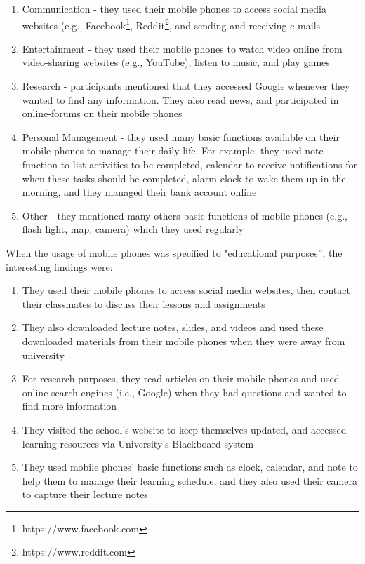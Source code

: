 \begin{enumerate}
\item Communication - they used their mobile phones to access social media websites (e.g., Facebook\footnote{https://www.facebook.com}, Reddit\footnote{https://www.reddit.com}, and sending and receiving e-mails

\item Entertainment - they used their mobile phones to watch video online from video-sharing websites (e.g., YouTube), listen to music, and play games

\item Research - participants mentioned that they accessed Google whenever they wanted to find any information. They also read news, and participated in online-forums on their mobile phones

\item Personal Management - they used many basic functions available on their mobile phones to manage their daily life. For example, they used note function to list activities to be completed, calendar to receive notifications for when these tasks should be completed, alarm clock to wake them up in the morning, and they managed their bank account online

\item Other - they mentioned many others basic functions of mobile phones (e.g., flash light, map, camera) which they used regularly
\end{enumerate}

When the usage of mobile phones was specified to "educational purposes'', the interesting findings were:

\begin{enumerate}
\item They used their mobile phones to access social media websites, then contact their classmates to discuss their lessons and assignments
\item They also downloaded lecture notes, slides, and videos and used these downloaded materials from their mobile phones when they were away from university
\item For research purposes, they read articles on their mobile phones and used online search engines (i.e., Google) when they had questions and wanted to find more information
\item They visited the school's website to keep themselves updated, and accessed learning resources via University's Blackboard system
\item They used mobile phones' basic functions such as clock, calendar, and note to help them to manage their learning schedule, and they also used their camera to capture their lecture notes
\end{enumerate}

